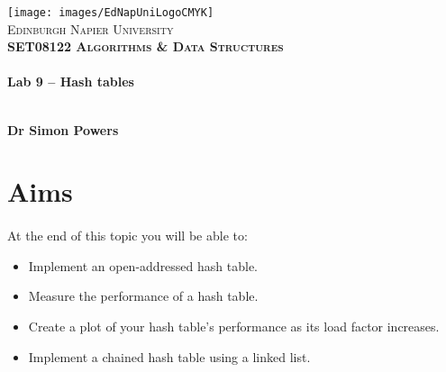 \documentclass[10pt, a4paper, twosize]{article}
\begin{document}

\begin{titlepage}
\vspace*{5cm}
\begin{center}
\texttt{[image: images/EdNapUniLogoCMYK]}~\\[1cm]

\textsc{\Large Edinburgh Napier University}\\[1.5cm]

\textsc{\LARGE \bfseries SET08122 Algorithms \& Data Structures}\\[0.5cm]

\hrulefill \\[0.4cm]
{\huge \bfseries Lab 9 -- Hash tables \\[0.4cm] }
\hrulefill \\[1.5cm]

\begin{minipage}{0.4\textwidth}
\begin{flushleft} \large
\textbf{Dr Simon Powers} \\
\end{flushleft}
\end{minipage}

\vfill

\end{center}
\end{titlepage}




%

\section{Aims}
\paragraph{} At the end of this topic you will be able to:

\begin{itemize}
\item Implement an open-addressed hash table.
\item Measure the performance of a hash table.
\item Create a plot of your hash table's performance as its load factor increases.
\item Implement a chained hash table using a linked list.
\end{itemize}
\end{document}

